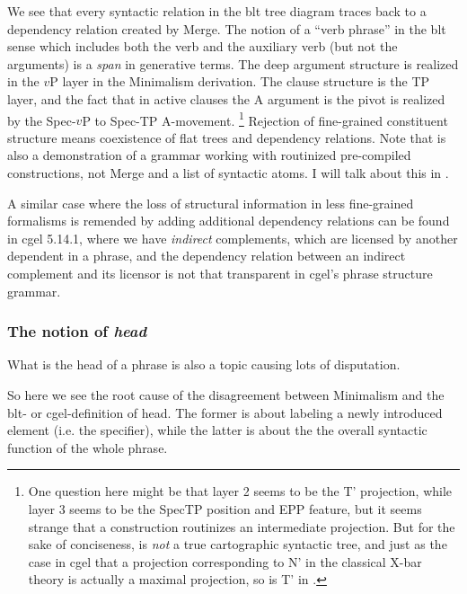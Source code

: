 \documentclass[../main.tex]{subfiles}
\begin{document}
We see that every syntactic relation in the \ac{blt} tree diagram traces back to a dependency relation created 
by Merge. The notion of a ``verb phrase'' in the \ac{blt} sense which includes both the verb and the auxiliary 
verb (but not the arguments) is a \emph{span} in generative terms. The deep argument structure is realized 
in the $v$P layer in the Minimalism derivation. The clause structure is the TP layer, and the fact that 
in active clauses the A argument is the pivot is realized by the Spec-$v$P to Spec-TP A-movement.%
\footnote{One question here might be that layer 2 seems to be the T' projection, while layer 3 seems to be 
the SpecTP position and EPP feature, but it seems strange that a construction routinizes an intermediate
projection. But for the sake of conciseness,  is \emph{not} 
a true cartographic syntactic tree, and just as the case in \ac{cgel} that a projection corresponding to 
N' in the classical X-bar theory is actually a maximal projection, so is T' in .}
Rejection of fine-grained constituent structure means coexistence of flat trees and dependency relations.
Note that  is also a demonstration of a grammar working with 
routinized pre-compiled constructions, not Merge and a list of syntactic atoms. I will 
talk about this in . %

A similar case where the loss of structural information in less fine-grained formalisms
is remended by adding additional dependency relations can be found in \ac{cgel} 5.14.1, where 
we have \emph{indirect} complements, which are licensed by another dependent in a phrase, 
and the dependency relation between an indirect complement and its licensor is not that 
transparent in \ac{cgel}'s phrase structure grammar.

\subsubsection{The notion of \emph{head}}\label{sec:headedness}

What is the head of a phrase is also a topic causing lots of disputation. 

So here we see the root cause of the disagreement between Minimalism and the \ac{blt}- or \ac{cgel}-definition 
of head. The former is about labeling a newly introduced element (i.e. the specifier), while the latter is about 
the the overall syntactic function of the whole phrase. 
\end{document}
